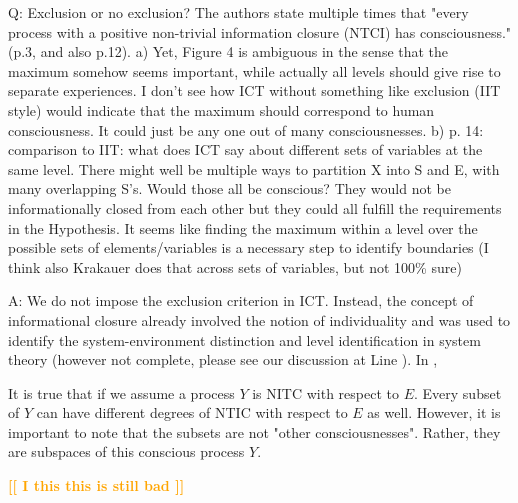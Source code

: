 \documentclass[utf8]{article}
\newcounter{cQuestion}[section]
\newenvironment{question}
    {\refstepcounter{cQuestion}\color{Blue}\noindent\newline Q\thecQuestion:}
    {~\newline}
\newenvironment{ans}  
    {\color{Black}\noindent A:}
    {~\newline}
\newcommand{\toWrite}[1]{\noindent
	\textcolor{Orange}{\textbf{[[ #1 ]]}}}
\begin{document}
        
        \begin{question}
            Exclusion or no exclusion? The authors state multiple times that "every process with a positive non-trivial information closure (NTCI) has consciousness." (p.3, and also p.12).
            a) Yet, Figure 4 is ambiguous in the sense that the maximum somehow seems important, while actually all levels should give rise to separate experiences. I don't see how ICT without something like exclusion (IIT style) would indicate that the maximum should correspond to human consciousness. It could just be any one out of many consciousnesses.
            b) p. 14: comparison to IIT: what does ICT say about different sets of variables at the same level. There might well be multiple ways to partition X into S and E, with many overlapping S's. Would those all be conscious? They would not be informationally closed from each other but they could all fulfill the requirements in the Hypothesis. It seems like finding the maximum within a level over the possible sets of elements/variables is a necessary step to identify boundaries (I think also Krakauer does that across sets of variables, but not 100\% sure)        
        \end{question}
    
    	\begin{ans}
			We do not impose the exclusion criterion in ICT. Instead, the concept of informational closure already involved the notion of individuality and was used to identify the system-environment distinction \citep{BERTSCHINGER.2006} and level identification \citep{PFANTE.2014} in system theory (however not complete, please see our discussion at Line ). In \cite{BERTSCHINGER.2006},
			
			It is true that if we assume a process $Y$ is NITC with respect to $E$. Every subset of $Y$ can have different degrees of NTIC with respect to $E$ as well. However, it is important to note that the subsets are not "other consciousnesses". Rather, they are subspaces of this conscious process $Y$.
			
			\toWrite{I this this is still bad}
			
    	\end{ans}
\end{document}
